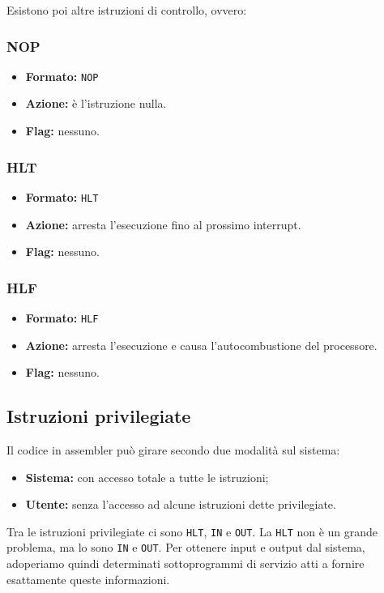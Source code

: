 \documentclass[a4paper,11pt]{article}
\begin{document}
\par\medskip 
Esistono poi altre istruzioni di controllo, ovvero:

\subsubsection{NOP}
\begin{itemize}
	\item \textbf{Formato:} \lstinline|NOP|
	\item \textbf{Azione:} è l'istruzione nulla. 
	\item \textbf{Flag:} nessuno.
\end{itemize}

\subsubsection{HLT}
\begin{itemize}
	\item \textbf{Formato:} \lstinline|HLT|
	\item \textbf{Azione:} arresta l'esecuzione fino al prossimo interrupt. 
	\item \textbf{Flag:} nessuno.
\end{itemize}

\subsubsection{HLF}
\begin{itemize}
	\item \textbf{Formato:} \lstinline|HLF|
	\item \textbf{Azione:} arresta l'esecuzione e causa l'autocombustione del processore. 
	\item \textbf{Flag:} nessuno.
\end{itemize}

\subsection{Istruzioni privilegiate}
Il codice in assembler può girare secondo due modalità sul sistema:
\begin{itemize}
	\item \textbf{Sistema:} con accesso totale a tutte le istruzioni;
	\item \textbf{Utente:} senza l'accesso ad alcune istruzioni dette privilegiate.
\end{itemize}

Tra le istruzioni privilegiate ci sono \lstinline|HLT|, \lstinline|IN| e \lstinline|OUT|.
La \lstinline|HLT| non è un grande problema, ma lo sono \lstinline|IN| e \lstinline|OUT|.
Per ottenere input e output dal sistema, adoperiamo quindi determinati sottoprogrammi di servizio atti a fornire esattamente queste informazioni.
\end{document}
